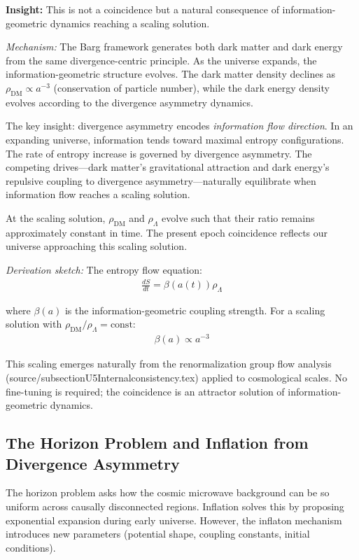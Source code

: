 \documentclass[12pt,a4paper]{article}
\begin{document}
\textbf{Insight:} This is not a coincidence but a natural consequence of information-geometric dynamics reaching a scaling solution.

\textit{Mechanism:} The Barg framework generates both dark matter and dark energy from the same divergence-centric principle. As the universe expands, the information-geometric structure evolves. The dark matter density declines as $\rho_{\text{DM}} \propto a^{-3}$ (conservation of particle number), while the dark energy density evolves according to the divergence asymmetry dynamics.

The key insight: divergence asymmetry encodes \textit{information flow direction}. In an expanding universe, information tends toward maximal entropy configurations. The rate of entropy increase is governed by divergence asymmetry. The competing drives---dark matter's gravitational attraction and dark energy's repulsive coupling to divergence asymmetry---naturally equilibrate when information flow reaches a scaling solution.

At the scaling solution, $\rho_{\text{DM}}$ and $\rho_\Lambda$ evolve such that their ratio remains approximately constant in time. The present epoch coincidence reflects our universe approaching this scaling solution.

\textit{Derivation sketch:} The entropy flow equation:
\begin{align}
\frac{dS}{dt} = \beta(a(t)) \rho_\Lambda
\end{align}

where $\beta(a)$ is the information-geometric coupling strength. For a scaling solution with $\rho_{\text{DM}} / \rho_\Lambda = \text{const}$:
\begin{align}
\beta(a) \propto a^{-3}
\end{align}

This scaling emerges naturally from the renormalization group flow analysis (source/subsectionU5Internalconsistency.tex) applied to cosmological scales. No fine-tuning is required; the coincidence is an attractor solution of information-geometric dynamics.

\subsection{The Horizon Problem and Inflation from Divergence Asymmetry}

The horizon problem asks how the cosmic microwave background can be so uniform across causally disconnected regions. Inflation solves this by proposing exponential expansion during early universe. However, the inflaton mechanism introduces new parameters (potential shape, coupling constants, initial conditions).
\end{document}
